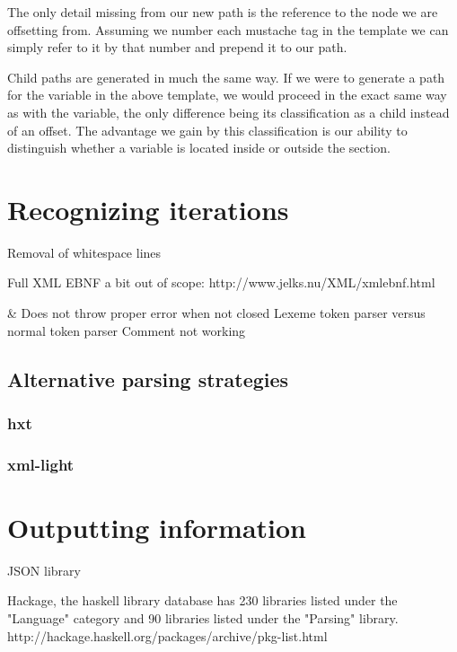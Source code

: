 The only detail missing from our new path is the reference to the node we are
offsetting from. Assuming we number each mustache tag in the template we can
simply refer to it by that number and prepend it to our path.

Child paths are generated in much the same way. If we were to generate a path
for the  variable in the above template, we would
proceed in the exact same way as with the  variable,
the only difference being its classification as a child instead of an offset.
The advantage we gain by this classification is our ability to distinguish
whether a variable is located inside or outside the section.


\section{Recognizing iterations}




Removal of whitespace lines


Full XML EBNF a bit out of scope: http://www.jelks.nu/XML/xmlebnf.html



\& Does not throw proper error when not closed
Lexeme token parser versus normal token parser
Comment not working




\subsection{Alternative parsing strategies}
\subsubsection{hxt}
\subsubsection{xml-light}

\section{Outputting information}
JSON library

Hackage, the haskell library database has 230 libraries listed under the
"Language" category and 90 libraries listed under the "Parsing" library.
http://hackage.haskell.org/packages/archive/pkg-list.html

